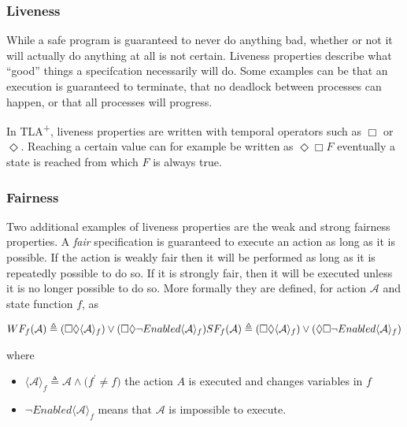 \documentclass[english, biblatex, digitaloutput]{kththesis}
\begin{document}
\subsubsection{Liveness}

While a safe program is guaranteed to never do anything bad, whether or not it will actually do anything at all is not certain. Liveness properties describe what ``good'' things a specifcation necessarily will do. Some examples can be that an execution is guaranteed to terminate, that no deadlock between processes can happen, or that all processes will progress.

In TLA\textsuperscript+, liveness properties are written with temporal operators such as $\Box$ or $\Diamond$. Reaching a certain value can for example be written as $\Diamond \Box F$ \ie eventually a state is reached from which $F$ is always true.

\subsubsection{Fairness}

Two additional examples of liveness properties are the weak and strong fairness properties. A \textit{fair} specification is guaranteed to execute an action as long as it is possible. If the action is weakly fair then it will be performed as long as it is repeatedly possible to do so. If it is strongly fair, then it will be executed unless it is no longer possible to do so. More formally they are defined, for action $\mathcal{A}$ and state function $f$, as

\begin{math}
	WF_f\lparen \mathcal{A} \rparen \triangleq \lparen \Box \Diamond \langle \mathcal{A} \rangle_f \rparen \lor  \lparen \Box \Diamond \neg Enabled \langle \mathcal{A} \rangle_f \rparen \\
	SF_f\lparen \mathcal{A} \rparen \triangleq \lparen \Box \Diamond \langle \mathcal{A} \rangle_f \rparen \lor  \lparen \Diamond \Box \neg Enabled \langle \mathcal{A} \rangle_f \rparen
\end{math}

where

\begin{itemize}
	\item $\langle \mathcal{A} \rangle_f \triangleq \mathcal{A} \land \lparen f^\prime \neq f \rparen $ \ie the action $A$ is executed and changes variables in $f$
	\item $\neg Enabled \langle \mathcal{A} \rangle_f$ means that $\mathcal{A}$ is impossible to execute.
\end{itemize}
\end{document}
